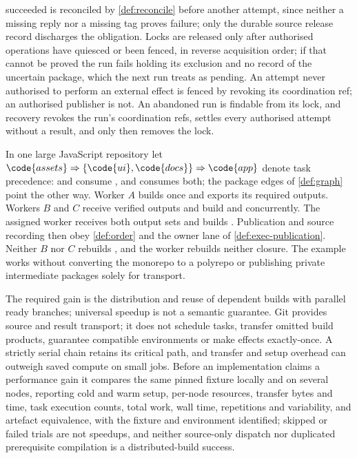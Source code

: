 \begin{definition}
succeeded is reconciled by \cref{def:reconcile} before another attempt, since
neither a missing reply nor a missing tag proves failure; only the durable
source release record discharges the obligation. Locks are released only after
authorised operations have quiesced or been fenced, in reverse acquisition
order; if that cannot be proved the run fails holding its exclusion and no
record of the uncertain package, which the next run treats as pending. An
attempt never authorised to perform an external effect is fenced by revoking
its coordination ref; an authorised publisher is not. An abandoned run is
findable from its lock, and recovery revokes the run's coordination refs,
settles every authorised attempt without a result, and only then removes the
lock.
\end{definition}

\begin{example}
\label{ex:exec-required}
In one large JavaScript repository let $\code{assets} \Rightarrow \{\code{ui},
\code{docs}\} \Rightarrow \code{app}$ denote task precedence:  and
 consume , and  consumes both; the package
edges of \cref{def:graph} point the other way. Worker $A$ builds 
once and exports its required outputs. Workers $B$ and $C$ receive verified
outputs and build  and  concurrently. The assigned
 worker receives both output sets and builds .
Publication and source recording then obey \cref{def:order} and the owner
lane of \cref{def:exec-publication}. Neither $B$ nor $C$ rebuilds
, and the  worker rebuilds neither closure. The
example works without converting the monorepo to a polyrepo or publishing
private intermediate packages solely for transport.
\end{example}

\begin{remark}
\label{rem:exec-boundary}
The required gain is the distribution and reuse of dependent builds with
parallel ready branches; universal speedup is not a semantic guarantee. Git
provides source and result transport; it does not schedule tasks, transfer
omitted build products, guarantee compatible environments or make effects
exactly-once. A strictly serial chain retains its critical path, and transfer
and setup overhead can outweigh saved compute on small jobs. Before an
implementation claims a performance gain it compares the same pinned fixture
locally and on several nodes, reporting cold and warm setup, per-node
resources, transfer bytes and time, task execution counts, total work, wall
time, repetitions and variability, and artefact equivalence, with the fixture
and environment identified; skipped or failed trials are not speedups, and
neither source-only dispatch nor duplicated prerequisite compilation is a
distributed-build success.
\end{remark}

